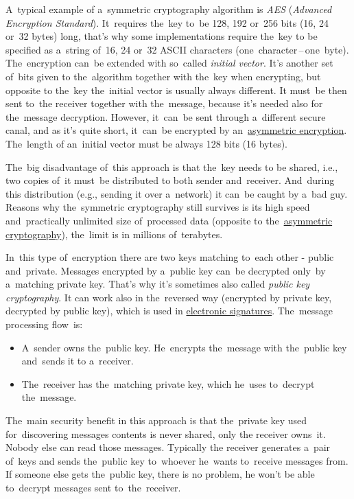 A~typical example of a~symmetric cryptography algorithm is \textit{AES} (\textit{Advanced Encryption Standard}).
It~requires the~key to~be 128, 192 or~256 bits (16, 24 or~32 bytes) long, that's why some implementations require the~key to be specified as a~string of~16, 24 or~32 ASCII characters (one~character\,--\,one~byte).
The~encryption can~be extended with so~called \textit{initial vector}.
It's another set of~bits given to the~algorithm together with the~key when encrypting, but opposite to the~key the~initial vector is usually always different.
It must~be then sent to~the receiver together with the~message, because it's needed also for the~message decryption.
However, it~can~be sent through a~different secure canal, and as it's quite short, it~can~be encrypted by an~\hyperref[asymmetriccryptography]{asymmetric encryption}.
The~length of an~initial vector must be always 128 bits (16 bytes).

The~big disadvantage of~this approach is that the~key needs to be shared, i.e., two copies of~it must~be distributed to both sender and~receiver.
And~during this distribution (e.g., sending it over a~network) it can~be caught by a~bad guy.
Reasons why the~symmetric cryptography still survives is its high speed and~practically unlimited size of~processed data (opposite to the~\hyperref[asymmetriccryptography]{asymmetric cryptography}), the~limit is in millions of~\mbox{terabytes}.

\label{asymmetriccryptography}
In~this type of~encryption there are two keys matching to~each other - public and~private.
Messages encrypted by a~public key can~be decrypted only~by a~matching private key.
That's why it's sometimes also called \textit{public key cryptography}.
It can work also in the~reversed way (encrypted by private key, decrypted by public key), which is used in \hyperref[electronicsignature]{electronic signatures}.
The~message processing flow~is:
\begin{itemize}
    \item A~sender owns the~public key.
          He~encrypts the~message with the~public key and~sends it to a~receiver.
    \item The~receiver has the~matching private key, which he~uses to~decrypt the~message.
\end{itemize}

\noindent The~main security benefit in this approach is that the~private key used for~discovering messages contents is never shared, only the receiver owns~it.
Nobody else can read those messages.
Typically the receiver generates a~pair of~keys and sends the~public key to~whoever he~wants to~receive messages from.
If someone else gets the~public key, there is no problem, he won't be able to~decrypt messages sent to~the~receiver.
\newpage

